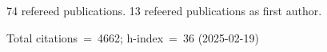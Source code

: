 74 refereed publications. 13 refeered publications as first author.

Total citations~=~4662; h-index~=~36 (2025-02-19)
